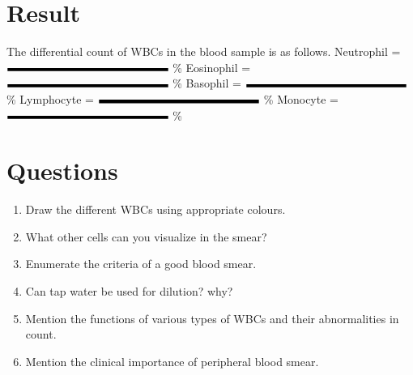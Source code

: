 \documentclass[a4paper,12pt]{book}
\begin{document}
					\section*{Result}
					The differential count of WBCs in the blood sample is as follows.\newline\vspace{.5cm}
					Neutrophil = $\rule{5cm}{0.1cm}$ \%\newline\vspace{.5cm}
					Eosinophil = $\rule{5cm}{0.1cm}$ \%\newline\vspace{.5cm}
					Basophil = $\rule{5cm}{0.1cm}$ \%\newline\vspace{.5cm}
					Lymphocyte = $\rule{5cm}{0.1cm}$ \%\newline\vspace{.5cm}
					Monocyte =$\rule{5cm}{0.1cm}$ \%
					
					\section*{Questions}
					\begin{enumerate}
						\item{Draw the different WBCs using appropriate colours.}
						\item{What other cells can you visualize in the smear?}
						\item{Enumerate the criteria of a good blood smear.}
						\item{Can tap water be used for dilution? why?}
						\item{Mention the functions of various types of WBCs and their abnormalities in count.}
						\item{Mention the clinical importance of peripheral blood smear.}
					\end{enumerate}

					\newpage
\end{document}
